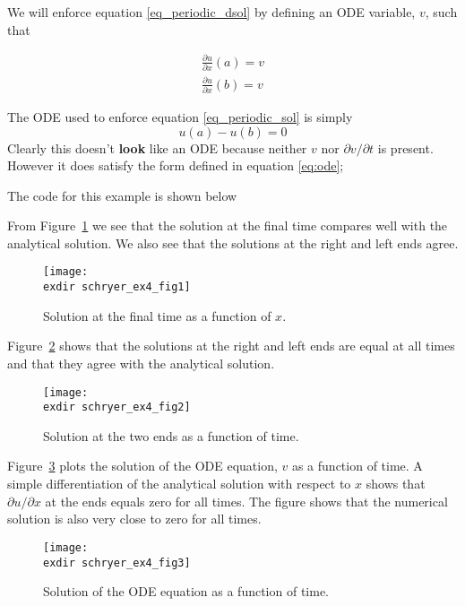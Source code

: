 \documentclass{article}
\begin{document}
We will enforce equation \eqref{eq_periodic_dsol} by defining an ODE
variable, $v$, such that

\begin{eqnarray}\label{eq_periodic_dsol_ode}
\frac{\partial u}{\partial x}(a)= v \\
\frac{\partial u}{\partial x}(b) = v
\end{eqnarray}

The ODE used to enforce equation \eqref{eq_periodic_sol} is simply
\begin{equation}\label{eq_periodic_sol_ode}
u(a)-u(b)=0
\end{equation}
Clearly this doesn't {\bf look} like an ODE because neither $v$ nor
$\partial v/\partial t$ is present. However it does satisfy the form
defined in equation \eqref{eq:ode};

The code for this example is shown below

From Figure~\ref{fig:schryer_ex4_fig1} 
we see that the solution at the final time
compares well with the analytical solution. We also see that the
solutions at the right and left ends agree.
\begin{figure}
\centering
\texttt{[image: \\exdir schryer\_ex4\_fig1]}
\caption{Solution at the final time as a function of $x$.}
\label{fig:schryer_ex4_fig1}
\end{figure}

Figure~\ref{fig:schryer_ex4_fig2} shows
that the solutions at the right and left ends are equal at all times
and that they agree with the analytical solution.
\begin{figure}
\centering
\texttt{[image: \\exdir schryer\_ex4\_fig2]}
\caption{Solution at the two ends as a function of time.}
\label{fig:schryer_ex4_fig2}
\end{figure}
 
Figure~\ref{fig:schryer_ex4_fig3}
plots the solution of the ODE equation, $v$ as a function of time.
A simple differentiation of the analytical solution with respect to
$x$ shows that $\partial u/\partial x$ at the ends equals zero for all
times. The figure shows that the numerical solution is also very close
to zero for all times.
\begin{figure}
\centering
\texttt{[image: \\exdir schryer\_ex4\_fig3]}
\caption{Solution of the ODE equation as a function of time.}
\label{fig:schryer_ex4_fig3}
\end{figure}
\end{document}

